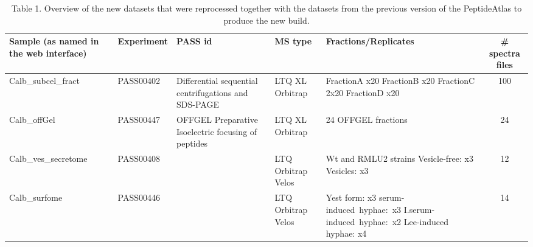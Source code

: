\begin{table}[t]

\renewcommand{\arraystretch}{1.5}
\caption*{Table 1. Overview of the new datasets that were reprocessed together with the datasets from the previous version of the PeptideAtlas to produce the
new build.}
\footnotesize
\centering
\begin{tabular}{p{2cm} p{1cm} p{2cm} p{1cm} p{2cm} c }
\hline
{\scriptsize Sample \newline (as named in \newline the web interface)} & {\scriptsize Experiment } & {\scriptsize PASS id } & {\scriptsize MS type } & {\scriptsize Fractions/Replicates } & {\scriptsize \# spectra files}\\
\hline
{\scriptsize Calb\_subcel\_fract} & {\scriptsize PASS00402} & {\scriptsize Differential \newline sequential \newline centrifugations \newline and \newline SDS-PAGE } & {\scriptsize LTQ XL  \newline Orbitrap } & {\scriptsize FractionA x20 \newline FractionB x20 \newline FractionC 2x20  \newline FractionD x20  } & 100 \\ 
{\scriptsize Calb\_offGel} & {\scriptsize PASS00447 } & {\scriptsize OFFGEL \newline Preparative \newline Isoelectric \newline focusing \newline of peptides } &  {\scriptsize LTQ XL \newline Orbitrap } & {\scriptsize 24 OFFGEL fractions} & 24\\
{\scriptsize Calb\_ves\_secretome} & {\scriptsize PASS00408} & {\scriptsize \citep{Gil-Bona2015a} } &  {\scriptsize LTQ \newline Orbitrap \newline Velos } & {\scriptsize Wt and RMLU2 strains \newline Vesicle-free: x3 \newline Vesicles: x3 } & 12\\
{\scriptsize Calb\_surfome} & {\scriptsize PASS00446} & {\scriptsize \citep{Gil-Bona2015} } & {\scriptsize LTQ \newline Orbitrap \newline Velos } & {\scriptsize Yest form: x3 \newline \mbox{serum-induced hyphae: x3}  \newline \mbox{I.serum-induced \mbox{hyphae}: x2} \newline Lee-induced \mbox{hyphae}: x4 } & 14\\

\end{tabular}

\end{table}


